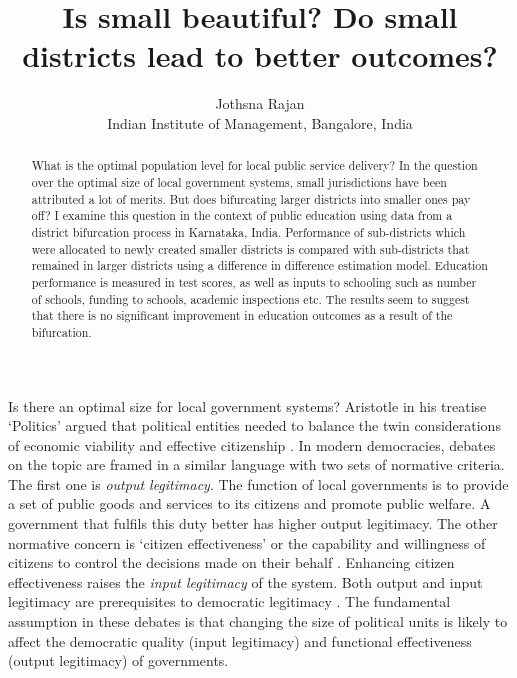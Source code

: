 \documentclass[12pt, a4paper]{article}
\title{Is small beautiful? Do small districts lead to better outcomes?}
\author{Jothsna Rajan \\
	\small{Indian Institute of Management, Bangalore, India}}
\begin{document}

	\maketitle
	\begin{abstract}
		What is the optimal population level for local public service delivery? In the question over the optimal size of local government systems, small jurisdictions have been attributed a lot of merits. But does bifurcating larger districts into smaller ones pay off? I examine this question in the context of public education using data from a district bifurcation process in Karnataka, India. Performance of sub-districts which were allocated to newly created smaller districts is compared with sub-districts that remained in larger districts using a difference in difference estimation model. Education performance is measured in test scores, as well as inputs to schooling such as number of schools, funding to schools, academic inspections etc. The results seem to suggest that there is no significant improvement in education outcomes as a result of the bifurcation. 
	\end{abstract}
\paragraph{} Is there an optimal size for local government systems? Aristotle in his treatise `Politics' argued that political entities needed to balance the twin considerations of economic viability and effective citizenship \parencite{aristotle_politics_1984}. In modern democracies, debates on the topic are framed in a similar language with two sets of normative criteria. The first one is \textit{output legitimacy}. The function of local governments is to provide a set of public goods and services to its citizens and promote public welfare. A government that fulfils this duty better has higher output legitimacy. The other normative concern is `citizen effectiveness' or the capability and willingness of citizens to control the decisions made on their behalf \parencite{dahl_size_1973}. Enhancing citizen effectiveness raises the \textit{input legitimacy} of the system. Both output and input legitimacy are prerequisites to democratic legitimacy \parencite{scharpf_governing_1999}. The fundamental assumption in these debates is that changing the size of political units is likely to affect the democratic quality (input legitimacy) and functional effectiveness (output legitimacy) of governments. 
\end{document}
